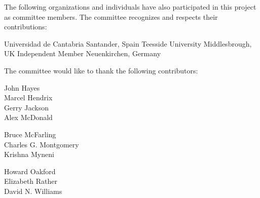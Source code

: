 The following organizations and individuals have also participated in
this project as committee members. The committee recognizes and
respects their contributions:

	{}	{Universidad de Cantabria}	{Santander, Spain}
		{}		{Teesside University}		{Middlesbrough, UK}
		{}			{Independent Member}		{Neuenkirchen, Germany}

The committee would like to thank the following contributors:

\begin{minipage}[t]{.3\linewidth}
John		Hayes \\
Marcel		Hendrix \\
Gerry		Jackson \\
Alex		McDonald \\
\end{minipage}
\hfill
\begin{minipage}[t]{.3\linewidth}
Bruce		McFarling \\
Charles G.	Montgomery \\
Krishna		Myneni \\
\end{minipage}
\hfill
\begin{minipage}[t]{.3\linewidth}
Howard		Oakford \\
Elizabeth	Rather \\
David N.	Williams \\
\end{minipage}